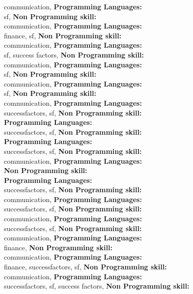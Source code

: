 communication, \textbf{Programming Languages:} \\
sf, \textbf{Non Programming skill:} \\
communication, \textbf{Programming Languages:} \\
finance, sf, \textbf{Non Programming skill:} \\
communication, \textbf{Programming Languages:} \\
sf, success factors, \textbf{Non Programming skill:} \\
communication, \textbf{Programming Languages:} \\
sf, \textbf{Non Programming skill:} \\
communication, \textbf{Programming Languages:} \\
sf, \textbf{Non Programming skill:} \\
communication, \textbf{Programming Languages:} \\
successfactors, sf, \textbf{Non Programming skill:} \\
\textbf{Programming Languages:} \\
successfactors, sf, \textbf{Non Programming skill:} \\
\textbf{Programming Languages:} \\
successfactors, sf, \textbf{Non Programming skill:} \\
communication, \textbf{Programming Languages:} \\
\textbf{Non Programming skill:} \\
\textbf{Programming Languages:} \\
successfactors, sf, \textbf{Non Programming skill:} \\
communication, \textbf{Programming Languages:} \\
successfactors, sf, \textbf{Non Programming skill:} \\
communication, \textbf{Programming Languages:} \\
successfactors, sf, \textbf{Non Programming skill:} \\
communication, \textbf{Programming Languages:} \\
finance, \textbf{Non Programming skill:} \\
communication, \textbf{Programming Languages:} \\
finance, successfactors, sf, \textbf{Non Programming skill:} \\
communication, \textbf{Programming Languages:} \\
successfactors, sf, success factors, \textbf{Non Programming skill:} \\
